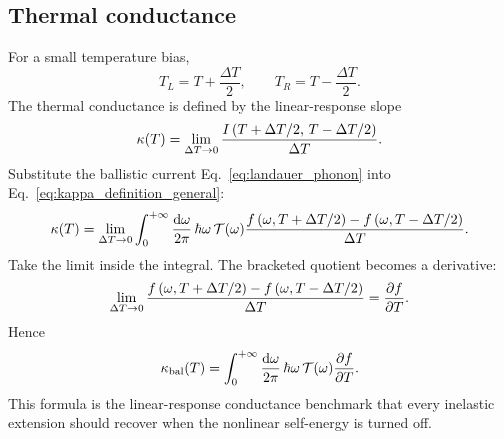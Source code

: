 \subsection{Thermal conductance}
For a small temperature bias,
\begin{equation}
    T_L = T + \frac{\Delta T}{2},
    \qquad
    T_R = T - \frac{\Delta T}{2}.
    \label{eq:small_bias_temperature_split}
\end{equation}
The thermal conductance is defined by the linear-response slope
\begin{equation}
    \kappa(T) = \lim_{\Delta T \to 0}\frac{I\left( T+\Delta T/2,\,T-\Delta T/2 \right)}{\Delta T}.
    \label{eq:kappa_definition_general}
\end{equation}
Substitute the ballistic current Eq.~\eqref{eq:landauer_phonon} into Eq.~\eqref{eq:kappa_definition_general}:
\begin{equation}
    \kappa(T) = \lim_{\Delta T\to 0}\int_0^{+\infty}\frac{\mathrm{d}\omega}{2\pi}\,\hbar\omega\,\mathcal T(\omega)
    \frac{f\left( \omega,T+\Delta T/2 \right) - f\left( \omega,T-\Delta T/2 \right)}{\Delta T}.
\end{equation}
Take the limit inside the integral. The bracketed quotient becomes a derivative:
\begin{equation}
    \lim_{\Delta T\to 0}
    \frac{f\left( \omega,T+\Delta T/2 \right) - f\left( \omega,T-\Delta T/2 \right)}{\Delta T}
    = \frac{\partial f}{\partial T}.
\end{equation}
Hence
\begin{equation}
    \kappa_{\rm bal}(T) = \int_0^{+\infty}\frac{\mathrm{d}\omega}{2\pi}\,\hbar\omega\,\mathcal T(\omega)\frac{\partial f}{\partial T}.
    \label{eq:kappa_ballistic}
\end{equation}
This formula is the linear-response conductance benchmark that every inelastic extension should recover when the nonlinear self-energy is turned off.
